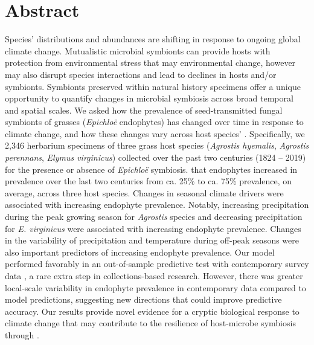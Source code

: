 \documentclass[11pt]{article}
\newcommand{\firstrevise}[1]{{\color{black}{#1}}}
\begin{document}
	\section*{Abstract}
Species' distributions and abundances are shifting in response to ongoing global climate change. 
Mutualistic microbial symbionts can provide hosts with protection from environmental stress that may \firstrevise{promote resilience under} environmental change, however \firstrevise{this change} may also disrupt species interactions and lead to declines in hosts and/or symbionts.
Symbionts preserved within natural history specimens offer a unique opportunity to quantify changes in microbial symbiosis across broad temporal and spatial scales. 
We asked how the prevalence of seed-transmitted fungal symbionts of grasses (\emph{Epichloë} endophytes) has changed over time in response to climate change, and how these changes vary across host species' \firstrevise{distributions}.
Specifically, we \firstrevise{examined} 2,346 herbarium specimens of three grass host species (\emph{Agrostis hyemalis}, \emph{Agrostis perennans}, \emph{Elymus virginicus}) collected over the past two centuries (1824 -- 2019) for the presence or absence of \emph{Epichloë} symbiosis.
\firstrevise{Analysis of an approximate Bayesian spatially-varying coefficients model revealed} that endophytes increased in prevalence over the last two centuries from ca. 25\% to ca. 75\% prevalence, on average, across three host species.
Changes in seasonal climate drivers were associated with increasing endophyte prevalence. 
Notably, increasing precipitation during the peak growing season for \emph{Agrostis} species and decreasing precipitation for \emph{E. virginicus} were associated with increasing endophyte prevalence.
Changes in the variability of precipitation and temperature during off-peak seasons were also important predictors of increasing endophyte prevalence. 
Our model performed favorably in an out-of-sample predictive test with contemporary survey data \firstrevise{from across 63 populations}, a rare extra step in collections-based research.
However, there was greater local-scale variability in endophyte prevalence in contemporary data compared to model predictions, suggesting new directions that could improve predictive accuracy.
Our results provide novel evidence for a cryptic biological response to climate change that may contribute to the resilience of host-microbe symbiosis through \firstrevise{fitness benefits to symbiotic hosts}. 
\end{document}
